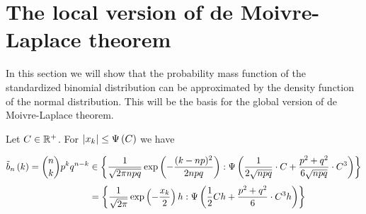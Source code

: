 \section{The local version of de Moivre-Laplace theorem}

In this section we will show that the probability mass function of the standardized binomial distribution can be approximated by the density function of the normal distribution. This will be the basis for the global version of de Moivre-Laplace theorem.

\begin{theorem}
  Let $C \in \mathbb R^{+}$. For $\left|{x_{k}}\right| \le \Psi\left( {C} \right)$ we have

  \begin{align}
    \bb{k} = \binom nk p^k q^{n-k} & \in \ean[\bigpsi{\frac{1}{2\sqrt{npq}} \cdot C + \frac{p^2+q^2}{6\sqrt{npq}} \cdot C^3}]{\frac{1}{\sqrt{2\pi npq}} \exp\left(-\frac{(k-np)^2}{2npq}\right)} \nl
    & = \ean[\bigpsi{\frac{1}{2} Ch + \frac{p^2+q^2}{6} \cdot C^3h}]{\frac{1}{\sqrt{2\pi}} \exp\left(-\frac{\x}{2}\right) h}
  \end{align}
\end{theorem}

